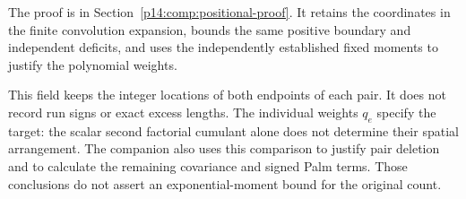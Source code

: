 The proof is in Section~\ref{p14:comp:positional-proof}. It retains the
coordinates in the finite convolution expansion, bounds the same positive
boundary and independent deficits, and uses the independently established
fixed moments to justify the polynomial weights.

This field keeps the integer locations of both endpoints of each pair.
It does not record run signs or exact excess lengths. The individual
weights $q_e$ specify the target: the scalar second factorial cumulant
alone does not determine their spatial arrangement. The companion also
uses this comparison to justify pair deletion and to calculate the
remaining covariance and signed Palm terms. Those conclusions do not
assert an exponential-moment bound for the original count.
